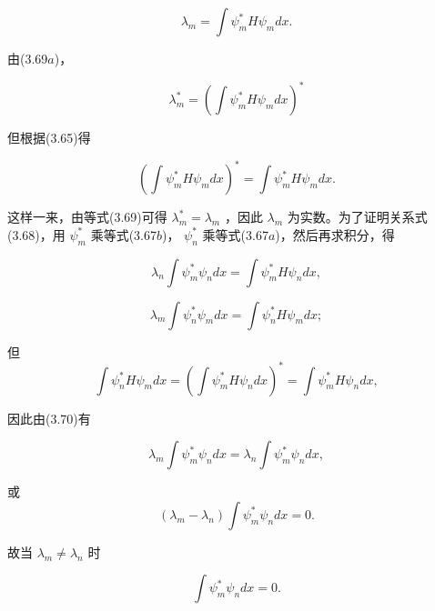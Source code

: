 \begin{equation*}
\lambda_ {m} = \int \psi_ {m} ^ {*} H \psi_ {m} d x.\tag{3.69a}
\end{equation*}

由(3.69$a$)，

\begin{equation*}
\lambda_ {m} ^ {*} = \left(\int \psi_ {m} ^ {*} H \psi_ {m} d x\right) ^ {*}\tag{3.69b}
\end{equation*}

但根据(3.65)得

\begin{equation*}
\left(\int \psi_ {m} ^ {*} H \psi_ {m} d x\right) ^ {*} = \int \psi_ {m} ^ {*} H \psi_ {m} d x.\tag{3.69c}
\end{equation*}

这样一来，由等式(3.69)可得 $\lambda_{m}^{*} = \lambda_{m}$ ，因此 $\lambda_{m}$ 为实数。为了证明关系式(3.68)，用 $\psi_{m}^{*}$ 乘等式(3.67$b$)， $\psi_{n}^{*}$ 乘等式(3.67$a$)，然后再求积分，得

\begin{equation*}
\lambda_ {n} \int \psi_ {m} ^ {*} \psi_ {n} d x = \int \psi_ {m} ^ {*} H \psi_ {n} d x,\tag{3.70a}
\end{equation*}

\begin{equation*}
\lambda_ {m} \int \psi_ {n} ^ {*} \psi_ {m} d x = \int \psi_ {n} ^ {*} H \psi_ {m} d x;\tag{3.70b}
\end{equation*}

但
\begin{equation*}
\int \psi_ {n} ^ {*} H \psi_ {m} d x = \left(\int \psi_ {m} ^ {*} H \psi_ {n} d x\right) ^ {*} = \int \psi_ {m} ^ {*} H \psi_ {n} d x,\tag{3.70c}
\end{equation*}

因此由(3.70)有

\begin{equation*}
\lambda_ {m} \int \psi_ {m} ^ {*} \psi_ {n} d x = \lambda_ {n} \int \psi_ {m} ^ {*} \psi_ {n} d x,
\end{equation*}

或
\begin{equation*}
(\lambda_ {m} - \lambda_ {n}) \int \psi_ {m} ^ {*} \psi_ {n} d x = 0.\tag{3.71}
\end{equation*}

故当 $\lambda_{m} \neq \lambda_{n}$ 时

\begin{equation*}
\int \psi_ {m} ^ {*} \psi_ {n} d x = 0.
\end{equation*}

